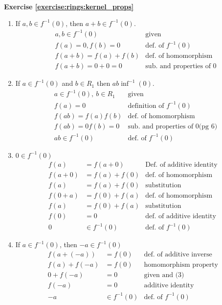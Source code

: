 \noindent\textbf{Exercise \ref{exercise:rings:kernel_props}}
\begin{enumerate}
\item If $a,b\in f^{-1}(0)$, then $a+b\in f^{-1}(0)$.
\begin{align*}
&a,b\in f^{-1}(0) & \text{given}\\
&f(a)=0,f(b)=0 & \text{def. of $f^{-1}(0)$}\\
&f(a+b)=f(a)+f(b) & \text{def. of homomorphism}\\
&f(a+b)=0+0=0 & \text{sub. and properties of 0}
\end{align*}
\item If $a\in f^{-1}(0)$ and $b\in R_1$ then $ab\inf^{-1}(0)$.
\begin{align*}
&a\in f^{-1}(0),~b\in R_1 & \text{given}\\
&f(a)=0 & \text{definition of $f^{-1}(0)$}\\
&f(ab)=f(a)f(b) & \text{def. of homomorphism}\\
&f(ab)=0f(b)=0 & \text{sub. and properties of 0(pg 6)}\\
&ab\in f^{-1}(0) & \text{def. of $f^{-1}(0)$}
\end{align*}
\item $0\in f^{-1}(0)$
\begin{align*}
f(a)&=f(a+0) & \text{Def. of additive identity}\\
f(a+0)&=f(a)+f(0) & \text{def. of homomorphism}\\
f(a)&=f(a)+f(0) & \text{substitution}\\
f(0+a)&=f(0)+f(a) & \text{def. of homomorphism}\\
f(a)&=f(0)+f(a) & \text{substitution}\\
f(0)&=0 & \text{def. of additive identity}\\
0&\in f^{-1}(0) & \text{def. of $f^{-1}(0)$}
\end{align*}
\item If $a\in f^{-1}(0)$, then $-a\in f^{-1}(0)$
\begin{align*}
f(a+(-a))&=f(0) & \text{def. of additive inverse}\\
f(a)+f(-a)&=f(0) & \text{homomorphism property}\\
0+f(-a)&=0 & \text{given and (3)}\\
f(-a)&=0 & \text{additive identity}\\
-a&\in f^{-1}(0) & \text{def. of $f^{-1}(0)$}
\end{align*}
\end{enumerate}


